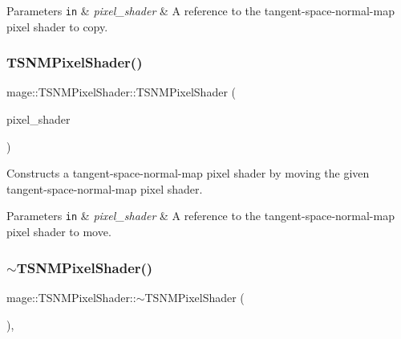 \begin{DoxyParams}[1]{Parameters}
\mbox{\tt in}  & {\em pixel\+\_\+shader} & A reference to the tangent-\/space-\/normal-\/map pixel shader to copy. \\
\hline
\end{DoxyParams}
\hypertarget{classmage_1_1_t_s_n_m_pixel_shader_a4889850bd4ff6c3a3d22c9637752ce37}{}\label{classmage_1_1_t_s_n_m_pixel_shader_a4889850bd4ff6c3a3d22c9637752ce37} 
\subsubsection{\texorpdfstring{T\+S\+N\+M\+Pixel\+Shader()}{TSNMPixelShader()}\hspace{0.1cm}{\footnotesize\ttfamily [4/4]}}
{\footnotesize\ttfamily mage\+::\+T\+S\+N\+M\+Pixel\+Shader\+::\+T\+S\+N\+M\+Pixel\+Shader (\begin{DoxyParamCaption}\item[{\hyperlink{classmage_1_1_t_s_n_m_pixel_shader}{T\+S\+N\+M\+Pixel\+Shader} \&\&}]{pixel\+\_\+shader }\end{DoxyParamCaption})\hspace{0.3cm}{\ttfamily [default]}}

Constructs a tangent-\/space-\/normal-\/map pixel shader by moving the given tangent-\/space-\/normal-\/map pixel shader.


\begin{DoxyParams}[1]{Parameters}
\mbox{\tt in}  & {\em pixel\+\_\+shader} & A reference to the tangent-\/space-\/normal-\/map pixel shader to move. \\
\hline
\end{DoxyParams}
\hypertarget{classmage_1_1_t_s_n_m_pixel_shader_ae7c20ffb872faffb28714b39916e4250}{}\label{classmage_1_1_t_s_n_m_pixel_shader_ae7c20ffb872faffb28714b39916e4250} 
\subsubsection{\texorpdfstring{$\sim$\+T\+S\+N\+M\+Pixel\+Shader()}{~TSNMPixelShader()}}
{\footnotesize\ttfamily mage\+::\+T\+S\+N\+M\+Pixel\+Shader\+::$\sim$\+T\+S\+N\+M\+Pixel\+Shader (\begin{DoxyParamCaption}{ }\end{DoxyParamCaption})\hspace{0.3cm}{\ttfamily [virtual]}, {\ttfamily [default]}}

